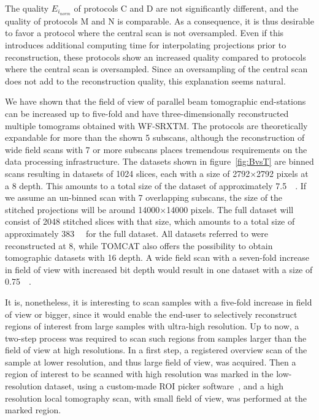 The quality $E_{i_{norm}}$ of protocols C and D are not significantly different, and the quality of protocols M and N is comparable. As a consequence, it is thus desirable to favor a protocol where the central scan is not oversampled. Even if this introduces additional computing time for interpolating projections prior to reconstruction, these protocols show an increased quality compared to protocols where the central scan is oversampled. Since an oversampling of the central scan does not add to the reconstruction quality, this explanation seems natural.

We have shown that the field of view of parallel beam tomographic end-stations can be increased up to five-fold and have three-dimensionally reconstructed multiple tomograms obtained with WF-SRXTM. The protocols are theoretically expandable for more than the shown 5 subscans, although the reconstruction of wide field scans with 7 or more subscans places tremendous requirements on the data processing infrastructure. The datasets shown in figure~\ref{fig:BvsT} are binned scans resulting in datasets of 1024 slices, each with a size of 2792$\times$2792 pixels at a \SI{8}{\bit} depth. This amounts to a total size of the dataset of approximately \SI{7.5}{\giga\byte}. If we assume an un-binned scan with 7 overlapping subscans, the size of the stitched projections will be around 14000$\times$14000 pixels. The full dataset will consist of 2048 stitched slices with that size, which amounts to a total size of approximately \SI{383}{\giga\byte} for the full dataset. All datasets referred to were reconstructed at \SI{8}{\bit}, while TOMCAT also offers the possibility to obtain tomographic datasets with \SI{16}{\bit} depth. A wide field scan with a seven-fold increase in field of view with increased bit depth would result in one dataset with a size of \SI{0.75}{\tera\byte}.

It is, nonetheless, it is interesting to scan samples with a five-fold increase in field of view or bigger, since it would enable the end-user to selectively reconstruct regions of interest from large samples with ultra-high resolution. Up to now, a two-step process was required to scan such regions from samples larger than the field of view at high resolutions. In a first step, a registered overview scan of the sample at lower resolution, and thus large field of view, was acquired. Then a region of interest to be scanned with high resolution was marked in the low-resolution dataset, using a custom-made ROI picker software~\cite{Heinzer2008}, and a high resolution local tomography scan, with small field of view, was performed at the marked region.

